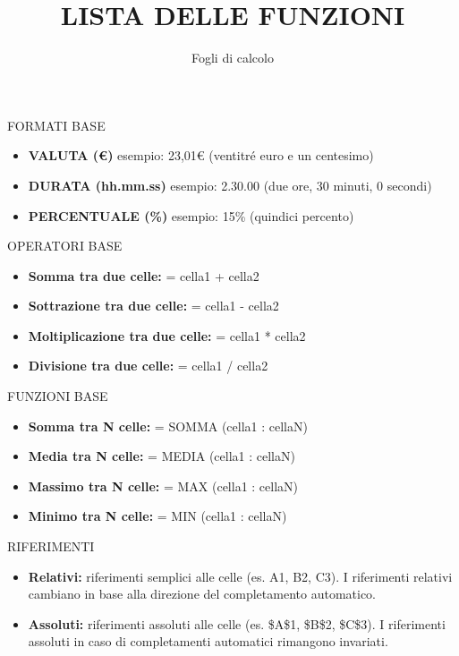 \documentclass[aspectratio=1610]{beamer}
\title{LISTA DELLE FUNZIONI}
\subtitle{Fogli di calcolo}
\date{}
\institute{}
\begin{document}
\begin{frame}
    \titlepage
\end{frame}

\begin{frame}{FORMATI BASE}
    \begin{itemize}
        \justifying
        \item \textbf{VALUTA (€)} esempio: 23,01€ (ventitré euro e un centesimo)
        \item \textbf{DURATA (hh.mm.ss)} esempio: 2.30.00 (due ore, 30 minuti, 0 secondi)
        \item \textbf{PERCENTUALE (\%)} esempio: 15\% (quindici percento)
    \end{itemize}
\end{frame}

\begin{frame}{OPERATORI BASE}
    \begin{itemize}
        \justifying
        \item \textbf{Somma tra due celle:} = cella1 + cella2
        \item \textbf{Sottrazione tra due celle:} = cella1 - cella2
        \item \textbf{Moltiplicazione tra due celle:} = cella1 * cella2
        \item \textbf{Divisione tra due celle:} = cella1 / cella2
    \end{itemize}
\end{frame}

\begin{frame}{FUNZIONI BASE}
    \begin{itemize}
        \justifying
        \item \textbf{Somma tra N celle:} = SOMMA (cella1 : cellaN)
        \item \textbf{Media tra N celle:} = MEDIA (cella1 : cellaN)
        \item \textbf{Massimo tra N celle:} = MAX (cella1 : cellaN)
        \item \textbf{Minimo tra N celle:} = MIN (cella1 : cellaN)
    \end{itemize}
\end{frame}

\begin{frame}{RIFERIMENTI}
    \begin{itemize}
        \justifying
        \item \textbf{Relativi:} riferimenti semplici alle celle (es. A1, B2, C3). I 
        riferimenti relativi cambiano in base alla direzione del completamento automatico.
    \item \textbf{Assoluti:} riferimenti assoluti alle celle (es. \$A\$1, \$B\$2, \$C\$3). 
        I riferimenti assoluti in caso di completamenti automatici rimangono invariati.
    \end{itemize}
\end{frame}
\end{document}
